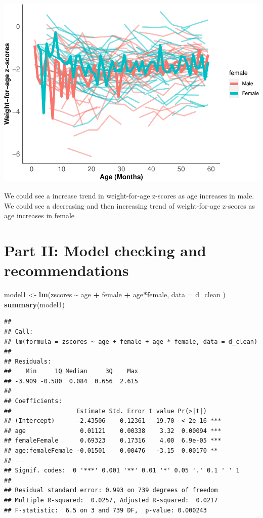 \documentclass[
]{article}
\newenvironment{Shaded}{\begin{snugshade}}{\end{snugshade}}
\newcommand{\AttributeTok}[1]{\textcolor[rgb]{0.13,0.29,0.53}{#1}}
\newcommand{\FunctionTok}[1]{\textcolor[rgb]{0.13,0.29,0.53}{\textbf{#1}}}
\newcommand{\NormalTok}[1]{#1}
\newcommand{\OtherTok}[1]{\textcolor[rgb]{0.56,0.35,0.01}{#1}}
\newcommand{\SpecialCharTok}[1]{\textcolor[rgb]{0.81,0.36,0.00}{\textbf{#1}}}
\begin{document}
\includegraphics{ProblemSet3_ts_1677791812_files/figure-latex/unnamed-chunk-6-1.pdf}

We could see a increase trend in weight-for-age z-scores as age
increases in male. We could see a decreasing and then increasing trend
of weight-for-age z-scores as age increases in female

\hypertarget{part-ii-model-checking-and-recommendations}{%
\section{Part II: Model checking and
recommendations}\label{part-ii-model-checking-and-recommendations}}

\begin{Shaded}
\begin{Highlighting}[]
\NormalTok{model1 }\OtherTok{\textless{}{-}} \FunctionTok{lm}\NormalTok{(zscores }\SpecialCharTok{\textasciitilde{}}\NormalTok{ age }\SpecialCharTok{+}\NormalTok{ female }\SpecialCharTok{+}\NormalTok{ age}\SpecialCharTok{*}\NormalTok{female, }\AttributeTok{data =}\NormalTok{ d\_clean )}
\FunctionTok{summary}\NormalTok{(model1)}
\end{Highlighting}
\end{Shaded}

\begin{verbatim}
## 
## Call:
## lm(formula = zscores ~ age + female + age * female, data = d_clean)
## 
## Residuals:
##    Min     1Q Median     3Q    Max 
## -3.909 -0.580  0.084  0.656  2.615 
## 
## Coefficients:
##                  Estimate Std. Error t value Pr(>|t|)    
## (Intercept)      -2.43506    0.12361  -19.70  < 2e-16 ***
## age               0.01121    0.00338    3.32  0.00094 ***
## femaleFemale      0.69323    0.17316    4.00  6.9e-05 ***
## age:femaleFemale -0.01501    0.00476   -3.15  0.00170 ** 
## ---
## Signif. codes:  0 '***' 0.001 '**' 0.01 '*' 0.05 '.' 0.1 ' ' 1
## 
## Residual standard error: 0.993 on 739 degrees of freedom
## Multiple R-squared:  0.0257, Adjusted R-squared:  0.0217 
## F-statistic:  6.5 on 3 and 739 DF,  p-value: 0.000243
\end{verbatim}
\end{document}
